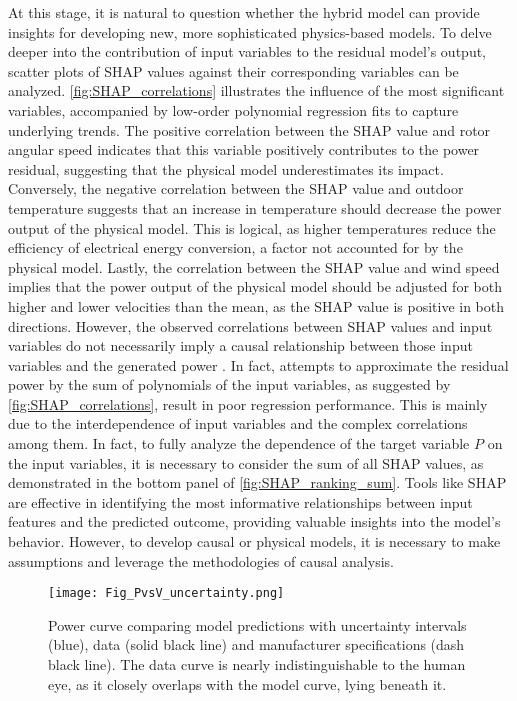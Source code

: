 \documentclass[preprint,12pt]{elsarticle}
\begin{document}
At this stage, it is natural to question whether the hybrid model can provide insights for developing new, more sophisticated physics-based models. To delve deeper into the contribution of input variables to the residual model's output, scatter plots of SHAP values against their corresponding variables can be analyzed. \autoref{fig:SHAP_correlations} illustrates the influence of the most significant variables, accompanied by low-order polynomial regression fits to capture underlying trends. 
The positive correlation between the SHAP value and rotor angular speed indicates that this variable positively contributes to the power residual, suggesting that the physical model underestimates its impact. Conversely, the negative correlation between the SHAP value and outdoor temperature suggests that an increase in temperature should decrease the power output of the physical model. This is logical, as higher temperatures reduce the efficiency of electrical energy conversion, a factor not accounted for by the physical model. Lastly, the correlation between the SHAP value and wind speed implies that the power output of the physical model should be adjusted for both higher and lower velocities than the mean, as the SHAP value is positive in both directions.
However, the observed correlations between SHAP values and input variables do not necessarily imply a causal relationship between those input variables and the generated power \cite{shap_causal_insights}. In fact, attempts to approximate the residual power by the sum of polynomials of the input variables, as suggested by \autoref{fig:SHAP_correlations}, result in poor regression performance. This is mainly due to the interdependence of input variables and the complex correlations among them. In fact, to fully analyze the dependence of the target variable $P$ on the input variables, it is necessary to consider the sum of all SHAP values, as demonstrated in the bottom panel of \autoref{fig:SHAP_ranking_sum}. Tools like SHAP are effective in identifying the most informative relationships between input features and the predicted outcome, providing valuable insights into the model's behavior. However, to develop causal or physical models, it is necessary to make assumptions and leverage the methodologies of causal analysis. 

\begin{figure}[t]
    \centering
    \texttt{[image: Fig\_PvsV\_uncertainty.png]}
    \caption{Power curve comparing model predictions with uncertainty intervals (blue), data (solid black line) and manufacturer specifications (dash black line). The data curve is nearly indistinguishable to the human eye, as it closely overlaps with the model curve, lying beneath it.}
    \label{fig:PvsV_uncertainty}
\end{figure}
\end{document}

